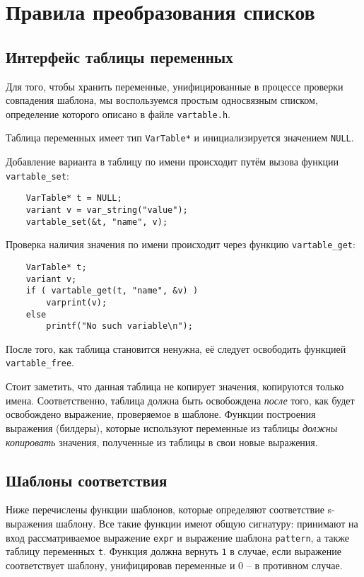 \documentclass[10pt]{report}
\begin{document}
\section{Правила преобразования списков}
\subsection{Интерфейс таблицы переменных}
Для того, чтобы хранить переменные, унифицированные в процессе проверки совпадения шаблона, мы воспользуемся
простым односвязным списком, определение которого описано в файле \texttt{vartable.h}.

Таблица переменных имеет тип \verb|VarTable*| и инициализируется значением \verb|NULL|. 

Добавление варианта в таблицу по имени происходит путём вызова функции \verb|vartable_set|:
\begin{verbatim}
    VarTable* t = NULL;
    variant v = var_string("value");
    vartable_set(&t, "name", v);
\end{verbatim}

Проверка наличия значения по имени происходит через функцию \verb|vartable_get|:
\begin{verbatim}
    VarTable* t;
    variant v;
    if ( vartable_get(t, "name", &v) ) 
        varprint(v);
    else 
        printf("No such variable\n");
\end{verbatim}

После того, как таблица становится ненужна, её следует освободить функцией \verb|vartable_free|.

Стоит заметить, что данная таблица не копирует значения, копируются только имена. Соответственно, таблица должна быть освобождена \emph{после} того, как будет освобождено выражение, проверяемое в шаблоне. Функции построения выражения (билдеры), которые используют переменные из таблицы \emph{должны копировать} значения, полученные из таблицы  в свои новые выражения.

\subsection{Шаблоны соответствия}
Ниже перечислены функции шаблонов, которые определяют соответствие s-выражения шаблону. 
Все такие функции имеют общую сигнатуру: принимают на вход рассматриваемое выражение {\tt expr} и выражение шаблона {\tt pattern}, а также таблицу переменных {\tt t}. 
Функция должна вернуть \verb|1| в случае, если выражение соответствует шаблону, унифицировав переменные и 0 -- в противном случае.
\end{document}
